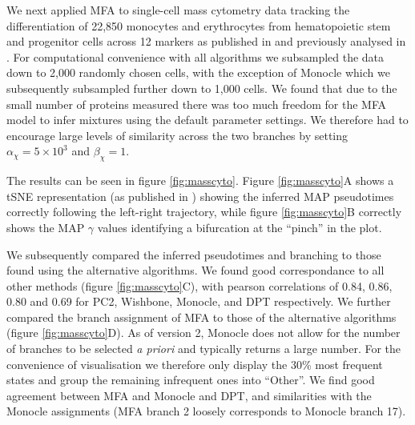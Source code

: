 We next applied MFA to single-cell mass cytometry data tracking the differentiation of 22,850 monocytes and erythrocytes from hematopoietic stem and progenitor cells across 12 markers as published in \cite{bendall2011single} and previously analysed in \cite{setty2016wishbone}. For computational convenience with all algorithms we subsampled the data down to 2,000 randomly chosen cells, with the exception of Monocle which we subsequently subsampled further down to 1,000 cells. We found that due to the small number of proteins measured there was too much freedom for the MFA model to infer mixtures using the default parameter settings. We therefore had to encourage large levels of similarity across the two branches by setting $\alpha_\chi = 5 \times 10^3$ and $\beta_\chi = 1$.

The results can be seen in figure \ref{fig:masscyto}. Figure \ref{fig:masscyto}A shows a tSNE representation (as published in \cite{setty2016wishbone}) showing the inferred MAP pseudotimes correctly following the left-right trajectory, while figure \ref{fig:masscyto}B correctly shows the MAP $\gamma$ values identifying a bifurcation at the ``pinch'' in the plot.

We subsequently compared the inferred pseudotimes and branching to those found using the alternative algorithms. We found good correspondance to all other methods (figure \ref{fig:masscyto}C), with pearson correlations of 0.84, 0.86, 0.80 and 0.69 for PC2, Wishbone, Monocle, and DPT respectively. We further compared the branch assignment of MFA to those of the alternative algorithms (figure \ref{fig:masscyto}D). As of version 2, Monocle does not allow for the number of branches to be selected \emph{a priori} and typically returns a large number. For the convenience of visualisation we therefore only display the 30\% most frequent states and group the remaining infrequent ones into ``Other''. We find good agreement between MFA and Monocle and DPT, and similarities with the Monocle assignments (MFA branch 2 loosely corresponds to Monocle branch 17).

